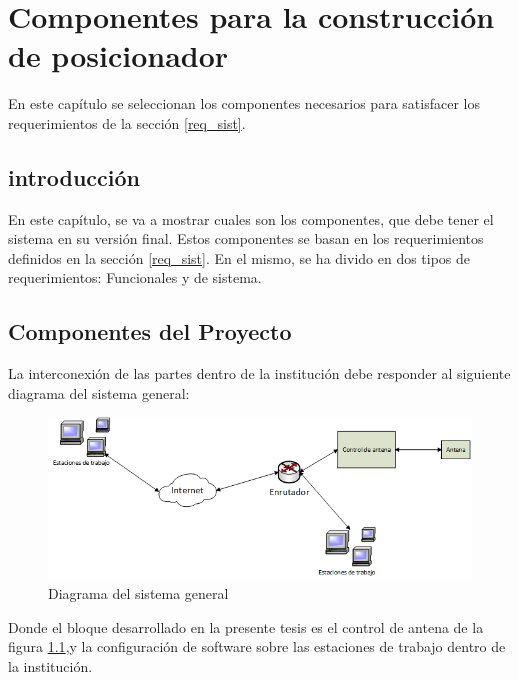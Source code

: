 \renewcommand{\chaptername}{Componentes para la construcción de posicionador}
\chapter{Componentes para la construcción de posicionador} 
\begin{center}
\begin{tcolorbox}[colback=gray!5!white, %
colframe=gray!75!black,
title= \center{\Large{resumen}} ]
En este capítulo se seleccionan los componentes necesarios para satisfacer los requerimientos de la sección \ref{req_sist}.   
\end{tcolorbox}
\end{center}    
\section{introducción}

En este capítulo, se va a mostrar cuales son los componentes, que debe tener el sistema en su versión final. Estos componentes se basan en los requerimientos definidos en la sección \ref{req_sist}. En el mismo, se ha divido en dos tipos de requerimientos: Funcionales y de sistema. 

\section{Componentes del Proyecto}

La interconexión de las partes dentro de la institución debe responder al siguiente diagrama del sistema general: 
\begin{figure}[ht]	
	\centering
	\includegraphics[scale=0.8]{parte_1/cap2/ssgen}
	\caption{Diagrama del sistema general}
	\label{fig:fig_ssgen}
\end{figure}


Donde el bloque desarrollado en la presente tesis es el control de antena de la figura \ref{fig:fig_ssgen},y la configuración de software sobre las estaciones de trabajo dentro de la institución. 

